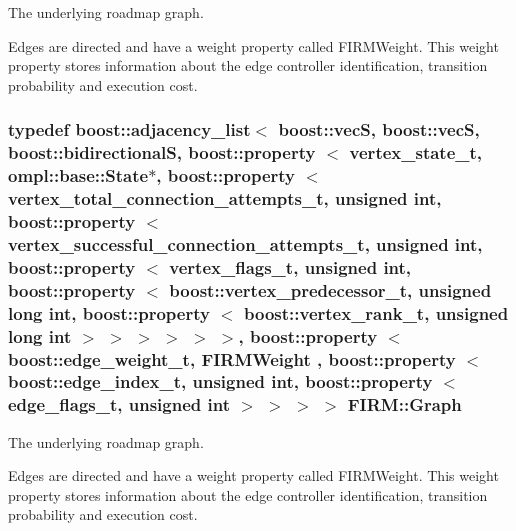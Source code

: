 \-The underlying roadmap graph. 

\begin{DoxyParagraph}{\-Edges are directed and have a weight property called \-F\-I\-R\-M\-Weight. \-This weight property}
stores information about the edge controller identification, transition probability and execution cost. 
\end{DoxyParagraph}
\hypertarget{class_f_i_r_m_a687e9f4243b22c30ee1fa5da22a85053}{
\subsubsection[{\-Graph}]{\setlength{\rightskip}{0pt plus 5cm}typedef boost\-::adjacency\-\_\-list$<$ boost\-::vec\-S, boost\-::vec\-S, boost\-::bidirectional\-S, boost\-::property $<$ {\bf vertex\-\_\-state\-\_\-t}, ompl\-::base\-::\-State$\ast$, boost\-::property $<$ {\bf vertex\-\_\-total\-\_\-connection\-\_\-attempts\-\_\-t}, unsigned int, boost\-::property $<$ {\bf vertex\-\_\-successful\-\_\-connection\-\_\-attempts\-\_\-t}, unsigned int, boost\-::property $<$ {\bf vertex\-\_\-flags\-\_\-t}, unsigned int, boost\-::property $<$ boost\-::vertex\-\_\-predecessor\-\_\-t, unsigned long int, boost\-::property $<$ boost\-::vertex\-\_\-rank\-\_\-t, unsigned long int $>$ $>$ $>$ $>$ $>$ $>$, boost\-::property $<$ boost\-::edge\-\_\-weight\-\_\-t, {\bf \-F\-I\-R\-M\-Weight} , boost\-::property $<$ boost\-::edge\-\_\-index\-\_\-t, unsigned int, boost\-::property $<$ {\bf edge\-\_\-flags\-\_\-t}, unsigned int $>$ $>$ $>$ $>$ {\bf \-F\-I\-R\-M\-::\-Graph}}}\label{class_f_i_r_m_a687e9f4243b22c30ee1fa5da22a85053}


\-The underlying roadmap graph. 

\begin{DoxyParagraph}{\-Edges are directed and have a weight property called \-F\-I\-R\-M\-Weight. \-This weight property}
stores information about the edge controller identification, transition probability and execution cost. 
\end{DoxyParagraph}


